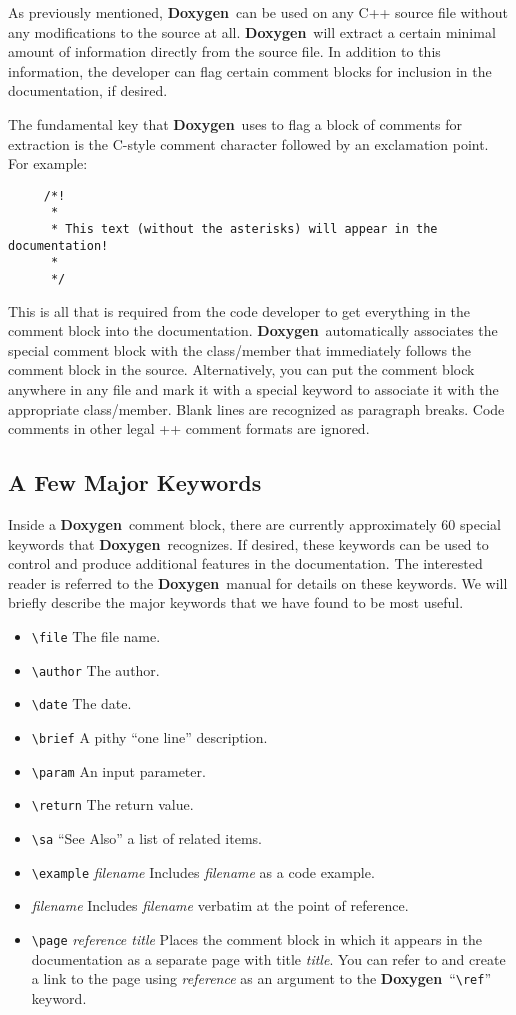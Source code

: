 \documentclass[11pt]{nmemo}
\newcommand{\doxy}{{\normalfont\bfseries Doxygen}}
\begin{document}
As previously mentioned, \doxy\ can be used on any C++ source file
without any modifications to the source at all.  \doxy\ will extract a
certain minimal amount of information directly from the source file.
In addition to this information, the developer can flag certain
comment blocks for inclusion in the documentation, if desired.

The fundamental key that \doxy\ uses to flag a block of comments for
extraction is the C-style comment character followed by an exclamation
point. For example:
\begin{verbatim}
     /*!
      *
      * This text (without the asterisks) will appear in the documentation!
      *
      */
\end{verbatim}
This is all that is required from the code developer to get everything
in the comment block into the documentation. \doxy\ automatically associates
the special comment block with the class/member that immediately follows the 
comment block in the source. Alternatively, you can put the comment block
anywhere in any file and mark it with a special keyword to associate it
with the appropriate class/member. Blank lines are recognized as paragraph
breaks. Code comments in other legal \C++ comment formats are ignored.

\subsection{A Few Major Keywords}

Inside a \doxy\ comment block, there are currently approximately 60
special keywords that \doxy\ recognizes. If desired, these keywords
can be used to control and produce additional features in the
documentation.  The interested reader is referred to the \doxy\ manual
for details on these keywords.  We will briefly describe the major
keywords that we have found to be most useful.
\begin{itemize}
\item \verb+\file+ The file name.
\item \verb+\author+ The author.
\item \verb+\date+ The date.
\item \verb+\brief+ A pithy ``one line'' description.
\item \verb+\param+ An input parameter.
\item \verb+\return+ The return value.
\item \verb+\sa+ ``See Also'' a list of related items.
\item \verb+\example+ {\em filename} Includes {\em filename} as a code
  example.
\item \verb++ {\em filename} Includes {\em filename} verbatim at the
  point of reference.
\item \verb+\page+ {\em reference title} Places the comment block in which
  it appears in the documentation as a separate page with title {\em
    title}. You can refer to and create a link to the page using {\em
    reference} as an argument to the \doxy\ ``\verb+\ref+'' keyword.
\end{itemize}
\end{document}
